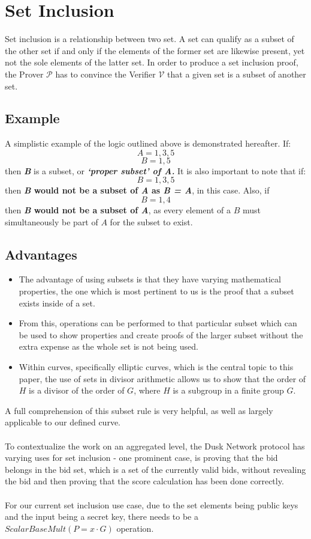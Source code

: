 \documentclass{article}
\begin{document}
\section{Set Inclusion}
Set inclusion is a relationship between two set. A set can qualify as a subset of the other set if and only if the elements of the former set are likewise present, yet not the sole elements of the latter set. In order to produce a set inclusion proof, the Prover $\mathcal{P}$ has to convince the Verifier $\mathcal{V}$ that a given set is a subset of another set.
\subsection{Example}
A simplistic example of the logic outlined above is demonstrated hereafter. If:  $$ A={1,3,5} $$
$$ B={1,5} $$ then \textbf{\textit{B}} is a subset, or \textbf{\textit{‘proper subset’ of A.}} 
It is also important to note that if: $$ B={1,3,5} $$ then \textbf{\textit{B} would not be a subset of \textit{A} as \textit{B = A}}, in this case. Also, if $$ B={1,4} $$ then \textbf{\textit{B} would not be a subset of \textit{A}}, as every element of a $B$ must simultaneously be part of $A$ for the subset to exist.
\subsection{Advantages}
\begin{itemize}
    \item The advantage of using subsets is that they have varying mathematical properties, the one which is most pertinent to us is the proof that a subset exists inside of a set.
    \item From this, operations can be performed to that particular subset which can be used to show properties and create proofs of the larger subset without the extra expense as the whole set is not being used.
    \item Within curves, specifically elliptic curves, which is the central topic to this paper, the use of sets in divisor arithmetic allows us to show that the order of $H$ is a divisor of the order of $G$, where $H$ is a subgroup in a finite group $G$.
\end{itemize}
A full comprehension of this subset rule is very helpful, as well as largely applicable to our defined curve. \\\\
To contextualize the work on an aggregated level, the Dusk Network protocol has varying uses for set inclusion -  one prominent case, is proving that the bid belongs in the bid set, which is a set of the currently valid bids, without revealing the bid and then proving that the score calculation has been done correctly. \\\\
For our current set inclusion use case, due to the set elements being public keys and the input being a secret key, there needs to be a $ScalarBaseMult (P=x\cdot G)$ operation.
\end{document}
